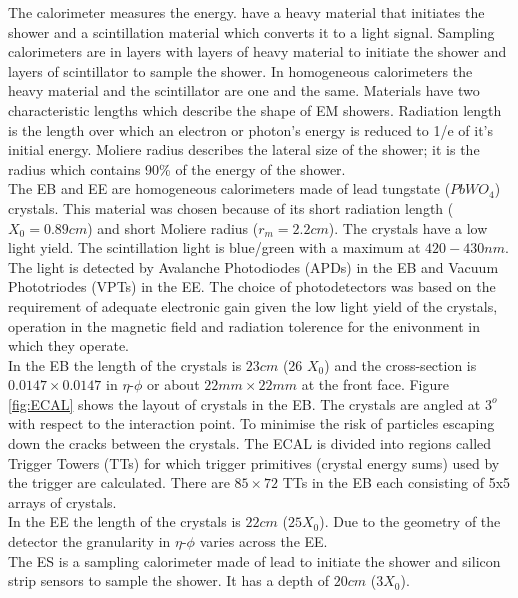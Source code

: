 The calorimeter measures the energy. have a heavy material that initiates the shower and a scintillation
material which converts it to a light signal. Sampling calorimeters are in
layers with layers of heavy material to initiate the shower and layers of
scintillator to sample the shower. In homogeneous calorimeters the heavy
material and the scintillator are one and the same. Materials have two
characteristic lengths which describe the shape of EM showers. Radiation length
is the length over which an electron or photon's energy is reduced to 1/e of
it's initial energy. Moliere radius describes the lateral size of the shower; it
is the radius which contains 90\% of the energy of the shower. \\  

The EB and EE are homogeneous calorimeters made of lead tungstate ($PbWO_{4}$)
crystals. This material was chosen because of its short radiation length ($X_{0}
= 0.89\unit{cm}$) and short Moliere radius ($r_{m} = 2.2\unit{cm}$). The 
crystals have a low light yield. The scintillation light is blue/green with a 
maximum at $420-430\unit{nm}$. The light is detected by Avalanche Photodiodes 
(APDs) in the EB and Vacuum Phototriodes (VPTs) in the EE. The choice of 
photodetectors was based on the requirement of adequate electronic gain given 
the low light yield of the crystals, operation in the magnetic field and 
radiation tolerence for the enivonment in which they operate. \\

In the EB the length of the crystals is $23\unit{cm}$ (26 $X_{0}$) and the 
cross-section is $0.0147\times0.0147$ in $\eta$-$\phi$ or about 
$22\unit{mm}\times22\unit{mm}$ at the front face. Figure \ref{fig:ECAL} shows 
the layout of crystals in the EB. The crystals are angled at $3^{o}$ with 
respect to the interaction point. To minimise the risk of particles escaping 
down the cracks between the crystals. The ECAL is divided into regions called 
Trigger Towers (TTs) for which trigger primitives (crystal energy sums) used by 
the trigger are calculated. There are $85\times72$ TTs in the EB each consisting 
of 5x5 arrays of crystals. \\

In the EE the length of the crystals is $22\unit{cm}$ ($25X_{0}$). Due to the 
geometry of the detector the granularity in $\eta$-$\phi$ varies across the EE. 
\\

The ES is a sampling calorimeter made of lead to initiate the shower and
silicon strip sensors to sample the shower. It has a depth of $20\unit{cm}$ 
($3X_{0}$). \\

